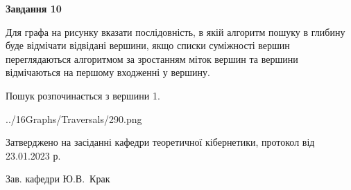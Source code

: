 \documentclass[12pt, ukrainian]{article}
\begin{document}
{\begin {large}
{\begin {center}\textbf{Завдання 10}\end {center}}\par
Для графа на рисунку вказати послідовність, в якій алгоритм пошуку в глибину буде відмічати відвідані вершини, якщо списки суміжності вершин переглядаються алгоритмом за зростанням міток вершин та вершини відмічаються на першому вход\-женні у вершину.\par
Пошук розпочинається з вершини 1.\par

\begin{center}
	{../16Graphs/Traversals/290.png}
\end{center}\par
\newpage


\end {large}
}
{\smallskip \begin {small} Затверджено на засіданні кафедри теоретичної кібернетики, протокол  від   23.01.2023 р.\par\smallskip\smallskip
{\parbox {6.5 cm}{Зав. кафедри \dotfill Ю.В.~Крак}} \end{small}}
\end{document}
